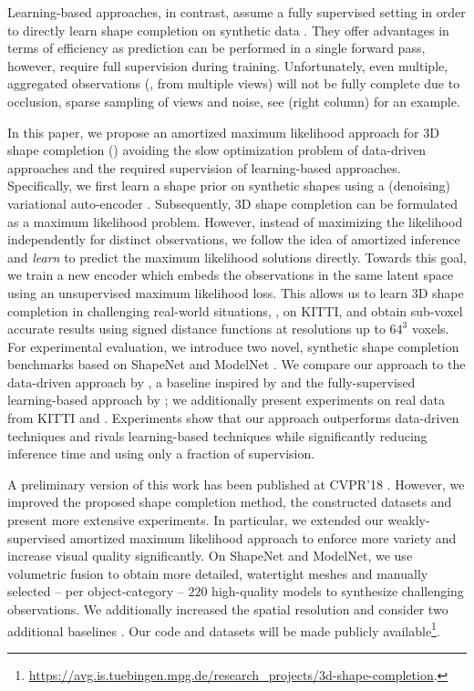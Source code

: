 Learning-based approaches, in contrast, assume a fully supervised setting in order to directly learn shape completion on synthetic data \citep{Riegler2017THREEDV,Smith2017ARXIV,Dai2017CVPRa,Sharma2016ARXIV,Fan2017CVPR,Rezende2016ARXIV,Yang2018ARXIVb,Wang2017ICCV,Varley2017IROS,Han2017ICCV}. They offer advantages in terms of efficiency as prediction can be performed in a single forward pass, however, require full supervision during training. Unfortunately, even multiple, aggregated observations (\eg, from multiple views) will not be fully complete due to occlusion, sparse sampling of views and noise, see  (right column) for an example.

In this paper, we propose an amortized maximum likelihood approach for 3D shape completion (\cf {}) avoiding the slow optimization problem of data-driven approaches and the required supervision of learning-based approaches. Specifically, we first learn a shape prior on synthetic shapes using a (denoising) variational auto-encoder \citep{Im2017AAAI,Kingma2014ICLR}. Subsequently, 3D shape completion can be formulated as a maximum likelihood problem. However, instead of maximizing the likelihood independently for distinct observations, we follow the idea of amortized inference \citep{Gersham2014COGSCI} and \emph{learn} to predict the maximum likelihood solutions directly. Towards this goal, we train a new encoder which embeds the observations in the same latent space using an unsupervised maximum likelihood loss. This allows us to learn 3D shape completion in challenging real-world situations, \eg, on KITTI, and obtain sub-voxel accurate results using signed distance functions at resolutions up to $64^3$ voxels. For experimental evaluation, we introduce two novel, synthetic shape completion benchmarks based on ShapeNet and ModelNet \citep{Wu2015CVPR}. We compare our approach to the data-driven approach by \cite{Engelmann2016GCPR}, a baseline inspired by \cite{Gupta2015CVPR} and the fully-supervised learning-based approach by \cite{Dai2017CVPRa}; we additionally present experiments on real data from KITTI and \Kinect \citep{Yang2018ARXIVb}. Experiments show that our approach outperforms data-driven techniques and rivals learning-based techniques while significantly reducing inference time and using only a fraction of supervision.

A preliminary version of this work has been published at CVPR'18 \citep{Stutz2018CVPR}. However, we improved the proposed shape completion method, the constructed datasets and present more extensive experiments. In particular, we extended our weakly-supervised amortized maximum likelihood approach to enforce more variety and increase visual quality significantly. On ShapeNet and ModelNet, we use volumetric fusion to obtain more detailed, watertight meshes and manually selected -- per object-category -- $220$ high-quality models to synthesize challenging observations. We additionally increased the spatial resolution and consider two additional baselines \citep{Dai2017CVPRa,Gupta2015CVPR}. Our code and datasets will be made publicly available\footnote{\url{https://avg.is.tuebingen.mpg.de/research_projects/3d-shape-completion}.}.

